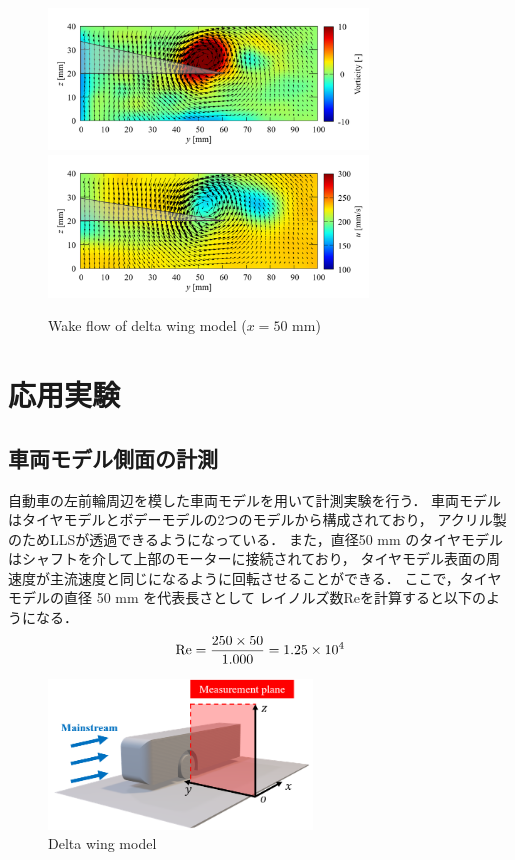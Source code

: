 \documentclass[twocolumn,a4j]{jsarticle}
\begin{document}
\begin{figure}[htbp]
  \centering
  {
    \includegraphics[keepaspectratio, width=85mm]{../images/WakeofDeltaWing_Vorticity_x=50.png}
    \includegraphics[keepaspectratio, width=85mm]{../images/WakeofDeltaWing_Velocity_x=50.png}
  }
  \caption{Wake flow of delta wing model ($x=50$ mm)}
\end{figure}

\newpage
\section{応用実験}
\subsection{車両モデル側面の計測}
自動車の左前輪周辺を模した車両モデルを用いて計測実験を行う．
車両モデルはタイヤモデルとボデーモデルの2つのモデルから構成されており，
アクリル製のためLLSが透過できるようになっている．
また，直径50 mm のタイヤモデルはシャフトを介して上部のモーターに接続されており，
タイヤモデル表面の周速度が主流速度と同じになるように回転させることができる．
ここで，タイヤモデルの直径 50 mm を代表長さとして
レイノルズ数Reを計算すると以下のようになる．
\begin{eqnarray*}
  \rm{Re} = \frac{250 \times 50}{1.000} = 1.25 \times 10^4
\end{eqnarray*}

\begin{figure}[htbp]
  \centering
  \includegraphics[keepaspectratio, width=70mm]{../images/ImageofVehicleModel.png}
  \caption{Delta wing model}
\end{figure}
\end{document}
